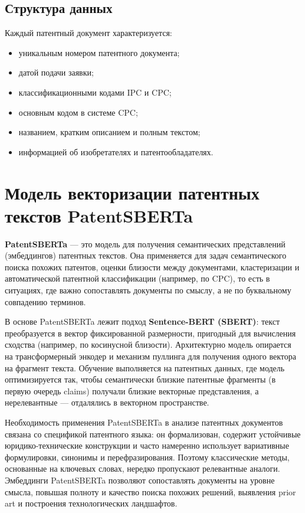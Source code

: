 \documentclass{article}
\begin{document}
\subsection{Структура данных}
Каждый патентный документ характеризуется:
\begin{itemize}
  \item уникальным номером патентного документа;
  \item датой подачи заявки;
  \item классификационными кодами IPC и CPC;
  \item основным кодом в системе CPC;
  \item названием, кратким описанием и полным текстом;
  \item информацией об изобретателях и патентообладателях.
\end{itemize}

\newpage
\section{Модель векторизации патентных текстов PatentSBERTa}
\textbf\textbf{PatentSBERTa} --- это модель для получения семантических представлений (эмбеддингов) патентных текстов. Она применяется для задач семантического поиска похожих патентов, оценки близости  между документами, кластеризации и автоматической патентной классификации (например, по CPC), то есть в ситуациях, где важно сопоставлять документы по смыслу, а не по буквальному совпадению терминов.

В основе PatentSBERTa лежит подход \textbf{Sentence-BERT (SBERT)}: текст преобразуется в вектор фиксированной размерности, пригодный для вычисления сходства (например, по косинусной близости). Архитектурно модель опирается на трансформерный энкодер и механизм пуллинга для получения одного вектора на фрагмент текста. Обучение выполняется на патентных данных, где модель оптимизируется так, чтобы семантически близкие патентные фрагменты (в первую очередь claims) получали близкие векторные представления, а нерелевантные --- отдалялись в векторном пространстве.

Необходимость применения PatentSBERTa в анализе патентных документов связана со спецификой патентного языка: он формализован, содержит устойчивые юридико-технические конструкции и часто намеренно использует вариативные формулировки, синонимы и перефразирования. Поэтому классические методы, основанные на ключевых словах, нередко пропускают релевантные аналоги. Эмбеддинги PatentSBERTa позволяют сопоставлять документы на уровне смысла, повышая полноту и качество поиска похожих решений, выявления prior art и построения технологических ландшафтов.
\end{document}
